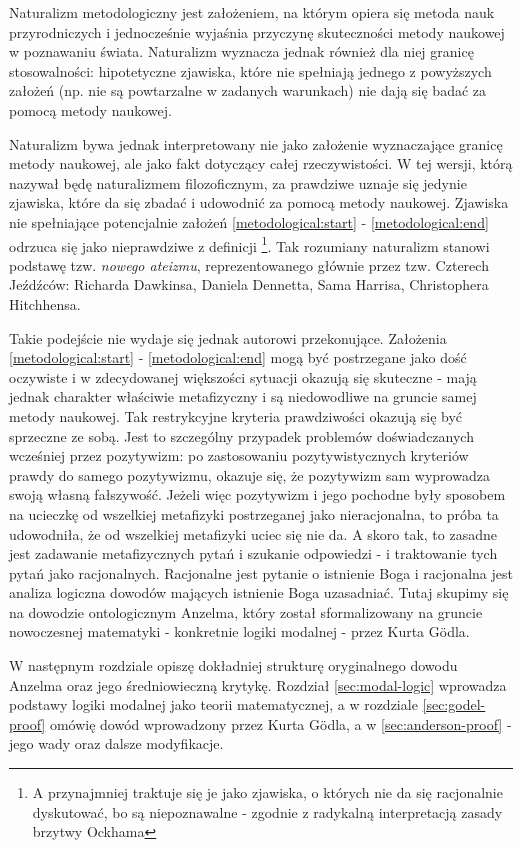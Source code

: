 \documentclass{article}
\begin{document}
Naturalizm metodologiczny jest założeniem, na którym opiera się metoda nauk przyrodniczych i jednocześnie wyjaśnia przyczynę skuteczności metody naukowej w poznawaniu świata. Naturalizm wyznacza jednak również dla niej granicę stosowalności: hipotetyczne zjawiska, które nie spełniają jednego z powyższych założeń (np. nie są powtarzalne w zadanych warunkach) nie dają się badać za pomocą metody naukowej.

Naturalizm bywa jednak interpretowany nie jako założenie wyznaczające granicę metody naukowej, ale jako fakt dotyczący całej rzeczywistości. W tej wersji, którą nazywał będę naturalizmem filozoficznym, za prawdziwe uznaje się jedynie zjawiska, które da się zbadać i udowodnić za pomocą metody naukowej. Zjawiska nie spełniające potencjalnie założeń \ref{metodological:start} - \ref{metodological:end} odrzuca się jako nieprawdziwe z definicji \footnote{A przynajmniej traktuje się je jako zjawiska, o których nie da się racjonalnie dyskutować, bo są niepoznawalne - zgodnie z radykalną interpretacją zasady brzytwy Ockhama}. Tak rozumiany naturalizm stanowi podstawę tzw. \emph{nowego ateizmu}, reprezentowanego głównie przez tzw. Czterech Jeźdźców: Richarda Dawkinsa, Daniela Dennetta, Sama Harrisa, Christophera Hitchhensa. 

Takie podejście nie wydaje się jednak autorowi przekonujące. Założenia \ref{metodological:start} - \ref{metodological:end} mogą być postrzegane jako dość oczywiste i w zdecydowanej większości sytuacji okazują się skuteczne - mają jednak charakter właściwie metafizyczny i są niedowodliwe na gruncie samej metody naukowej. Tak restrykcyjne kryteria prawdziwości okazują się być sprzeczne ze sobą. Jest to szczególny przypadek problemów doświadczanych wcześniej przez pozytywizm: po zastosowaniu pozytywistycznych kryteriów prawdy do samego pozytywizmu, okazuje się, że pozytywizm sam wyprowadza swoją własną fałszywość. Jeżeli więc pozytywizm i jego pochodne były sposobem na ucieczkę od wszelkiej metafizyki postrzeganej jako nieracjonalna, to próba ta udowodniła, że od wszelkiej metafizyki uciec się nie da. A skoro tak, to zasadne jest zadawanie metafizycznych pytań i szukanie odpowiedzi - i traktowanie tych pytań jako racjonalnych. Racjonalne jest pytanie o istnienie Boga i racjonalna jest analiza logiczna dowodów mających istnienie Boga uzasadniać. Tutaj skupimy się na dowodzie ontologicznym Anzelma, który został sformalizowany na gruncie nowoczesnej matematyki - konkretnie logiki modalnej - przez Kurta Gödla. 

W następnym rozdziale opiszę dokładniej strukturę oryginalnego dowodu Anzelma oraz jego średniowieczną krytykę. Rozdział \ref{sec:modal-logic} wprowadza podstawy logiki modalnej jako teorii matematycznej, a w rozdziale \ref{sec:godel-proof} omówię dowód wprowadzony przez Kurta Gödla, a w \ref{sec:anderson-proof} - jego wady oraz dalsze modyfikacje. 
\end{document}
